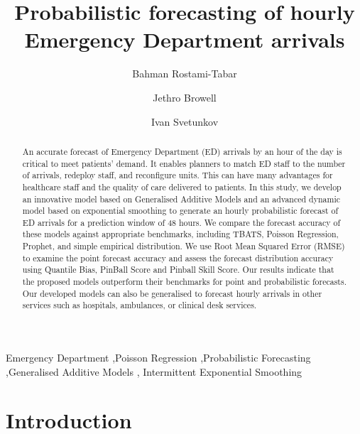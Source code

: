 \documentclass[]{elsarticle} %
\begin{document}
\begin{frontmatter}

  \title{Probabilistic forecasting of hourly Emergency Department arrivals}
    \author[CBS]{Bahman Rostami-Tabar%
  }
    \author[UG]{Jethro Browell%
  }
    \author[LU]{Ivan Svetunkov%
  }
  
  \begin{abstract}
  An accurate forecast of Emergency Department (ED) arrivals by an hour of the day is critical to meet patients' demand. It enables planners to match ED staff to the number of arrivals, redeploy staff, and reconfigure units. This can have many advantages for healthcare staff and the quality of care delivered to patients. In this study, we develop an innovative model based on Generalised Additive Models and an advanced dynamic model based on exponential smoothing to generate an hourly probabilistic forecast of ED arrivals for a prediction window of 48 hours. We compare the forecast accuracy of these models against appropriate benchmarks, including TBATS, Poisson Regression, Prophet, and simple empirical distribution. We use Root Mean Squared Error (RMSE) to examine the point forecast accuracy and assess the forecast distribution accuracy using Quantile Bias, PinBall Score and Pinball Skill Score. Our results indicate that the proposed models outperform their benchmarks for point and probabilistic forecasts. Our developed models can also be generalised to forecast hourly arrivals in other services such as hospitals, ambulances, or clinical desk services.
  \end{abstract}
    \begin{keyword}
    Emergency Department \sep Poisson Regression \sep Probabilistic Forecasting \sep Generalised Additive Models \sep 
    Intermittent Exponential Smoothing
  \end{keyword}
  
 \end{frontmatter}

\hypertarget{introduction}{%
\section{Introduction}\label{introduction}}
\end{document}
